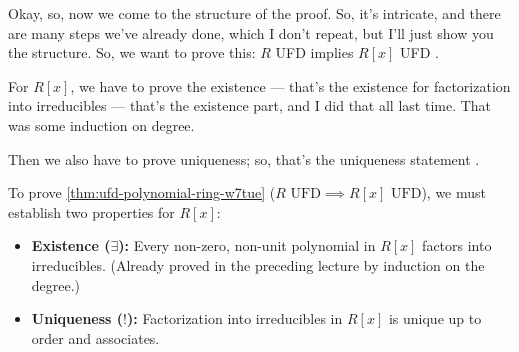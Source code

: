 \begin{speech}[00:11:19 - 00:12:13]
Okay, so, now we come to the structure of the proof. So, it's intricate, and there are many steps we've already done, which I don't repeat, but I'll just show you the structure. So, we want to prove this: $R$ UFD implies $R[x]$ UFD .

For $R[x]$, we have to prove the existence  --- that's the existence for factorization into irreducibles  --- that's the existence part, and I did that all last time. That was some induction on degree.

Then we also have to prove uniqueness; so, that's the uniqueness statement .
\end{speech}

\begin{content}
To prove \cref{thm:ufd-polynomial-ring-w7tue} ($R \text{ UFD} \implies R[x] \text{ UFD}$), we must establish two properties for $R[x]$:
\begin{itemize}
    \item \textbf{Existence ($\exists$):} Every non-zero, non-unit polynomial in $R[x]$ factors into irreducibles. (Already proved in the preceding lecture by induction on the degree.)
    \item \textbf{Uniqueness ($!$):} Factorization into irreducibles in $R[x]$ is unique up to order and associates.
\end{itemize}
\end{content}

